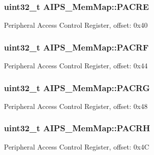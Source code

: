 \subsubsection[{P\+A\+C\+R\+E}]{\setlength{\rightskip}{0pt plus 5cm}uint32\+\_\+t A\+I\+P\+S\+\_\+\+Mem\+Map\+::\+P\+A\+C\+R\+E}\label{struct_a_i_p_s___mem_map_ad1f2d4b98aea7609a045558a9dc20f7b}
Peripheral Access Control Register, offset\+: 0x40 \hypertarget{struct_a_i_p_s___mem_map_aedfe0bcf944c983903be902a97a1f59a}{}
\subsubsection[{P\+A\+C\+R\+F}]{\setlength{\rightskip}{0pt plus 5cm}uint32\+\_\+t A\+I\+P\+S\+\_\+\+Mem\+Map\+::\+P\+A\+C\+R\+F}\label{struct_a_i_p_s___mem_map_aedfe0bcf944c983903be902a97a1f59a}
Peripheral Access Control Register, offset\+: 0x44 \hypertarget{struct_a_i_p_s___mem_map_a7eb01b8a7f5cbdd90e2cfc1103dc818e}{}
\subsubsection[{P\+A\+C\+R\+G}]{\setlength{\rightskip}{0pt plus 5cm}uint32\+\_\+t A\+I\+P\+S\+\_\+\+Mem\+Map\+::\+P\+A\+C\+R\+G}\label{struct_a_i_p_s___mem_map_a7eb01b8a7f5cbdd90e2cfc1103dc818e}
Peripheral Access Control Register, offset\+: 0x48 \hypertarget{struct_a_i_p_s___mem_map_af4ac7a20bb8f381f2f77e21ed14d5e91}{}
\subsubsection[{P\+A\+C\+R\+H}]{\setlength{\rightskip}{0pt plus 5cm}uint32\+\_\+t A\+I\+P\+S\+\_\+\+Mem\+Map\+::\+P\+A\+C\+R\+H}\label{struct_a_i_p_s___mem_map_af4ac7a20bb8f381f2f77e21ed14d5e91}
Peripheral Access Control Register, offset\+: 0x4\+C \hypertarget{struct_a_i_p_s___mem_map_a75787ffd284dd47814093fbe8d28232d}{}
